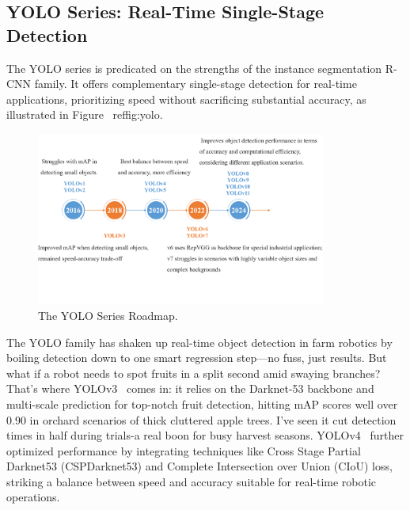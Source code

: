 \documentclass[pdflatex,sn-mathphys-num]{sn-jnl}
\begin{document}
\subsection{YOLO Series: Real-Time Single-Stage Detection}
The YOLO series is predicated on the strengths of the instance segmentation R-CNN family. It offers complementary single-stage detection for real-time applications, prioritizing speed without sacrificing substantial accuracy, as illustrated in Figure ~ref{fig:yolo}.
\begin{figure}[hbtp]
\centering
\includegraphics[width=0.85\textwidth]{fig_yolo.png}
\caption{The YOLO Series Roadmap.}
\label{fig:yolo}
\end{figure}

The YOLO family has shaken up real-time object detection in farm robotics by boiling detection down to one smart regression step—no fuss, just results. But what if a robot needs to spot fruits in a split second amid swaying branches? That's where YOLOv3~\cite{redmon2018yolov3} comes in: 
it relies on the Darknet-53 backbone and multi-scale prediction for top-notch fruit detection, hitting mAP scores well over 0.90 in orchard scenarios of thick cluttered apple trees. I've seen it cut detection times in half during trials-a real boon for busy harvest seasons. YOLOv4~\cite{bochkovskiy2020yolov4} further optimized performance by integrating techniques like Cross Stage Partial Darknet53 (CSPDarknet53) and Complete Intersection over Union (CIoU) loss, striking a balance between speed and accuracy suitable for real-time robotic operations. 
\end{document}
